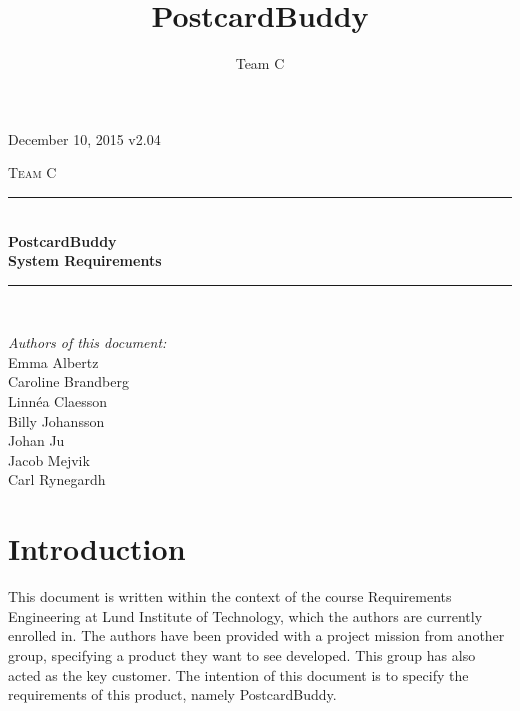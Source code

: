 \documentclass[10pt,a4paper]{article}
\title{PostcardBuddy}
\author{Team C}
\begin{document}
\begin{titlepage}
\newcommand{\HRule}{\rule{\linewidth}{0.5mm}}


\begin{flushright}
December 10, 2015 v2.04\\[3cm]
\end{flushright}


\centering
\textsc{\LARGE Team C}\\[0.5cm]

\HRule \\[0.4cm]
{ \huge \bfseries PostcardBuddy}\\[0.3cm]
{\Large \bfseries System Requirements}\\[0.4cm] %
\HRule \\[1.5cm]

\vfill
\begin{flushleft}
\textit{Authors of this document:}\\
Emma Albertz\\
Caroline Brandberg\\
Linnéa Claesson\\
Billy Johansson\\
Johan Ju\\
Jacob Mejvik\\
Carl Rynegardh
\end{flushleft}

\end{titlepage}



%



\setcounter{tocdepth}{2}
\tableofcontents
\newpage
{}

\section{Introduction}
This document is written within the context of the course Requirements Engineering at Lund Institute of Technology, which the authors are currently enrolled in. The authors have been provided with a project mission from another group, specifying a product they want to see developed. This group has also acted as the key customer. The intention of this document is to specify the requirements of this product, namely PostcardBuddy.
\end{document}
